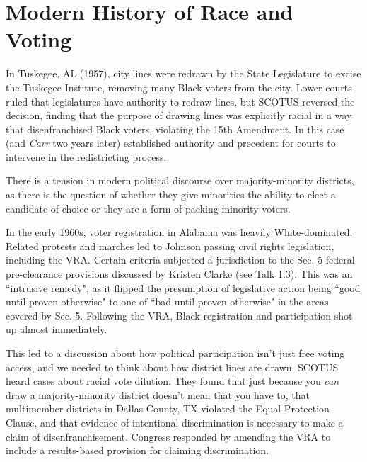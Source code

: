 




\section*{Modern History of Race and Voting}

In Tuskegee, AL (1957), city lines were redrawn by the State Legislature to excise the Tuskegee Institute, removing many Black voters from the city.  Lower courts ruled that legislatures have authority to redraw lines, but SCOTUS reversed the decision, finding that the purpose of drawing lines was explicitly racial in a way that disenfranchised Black voters, violating the 15th Amendment.  In this case (and \textit{Carr} two years later) established authority and precedent for courts to intervene in the redistricting process.

There is a tension in modern political discourse over majority-minority districts, as there is the question of whether they give minorities the ability to elect a candidate of choice or they are a form of packing minority voters.

In the early 1960s, voter registration in Alabama was heavily White-dominated.  Related protests and marches led to Johnson passing civil rights legislation, including the VRA.  Certain criteria subjected a jurisdiction to the Sec. 5 federal pre-clearance provisions discussed by Kristen Clarke (see Talk 1.3).  This was an ``intrusive remedy", as it flipped the presumption of legislative action being ``good until proven otherwise" to one of ``bad until proven otherwise" in the areas covered by Sec. 5.  Following the VRA, Black registration and participation shot up almost immediately.

This led to a discussion about how political participation isn't just free voting access, and we needed to think about how district lines are drawn.  SCOTUS heard cases about racial vote dilution. They found that just because you \textit{can} draw a majority-minority district doesn't mean that you have to, that multimember districts in Dallas County, TX violated the Equal Protection Clause, and that evidence of intentional discrimination is necessary to make a claim of disenfranchisement.  Congress responded by amending the VRA to include a results-based provision for claiming discrimination.

